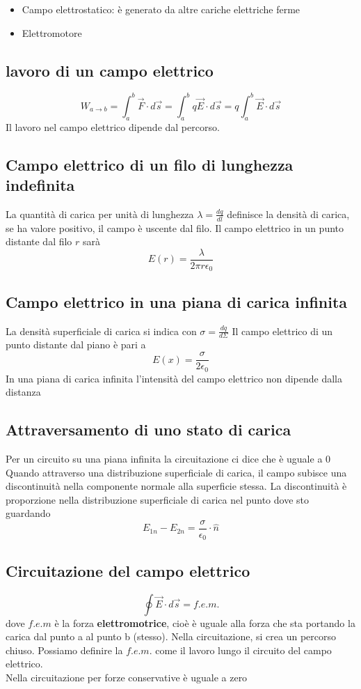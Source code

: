 \documentclass[a4paper]{report}
\begin{document}
  \begin{itemize}
    \item Campo elettrostatico: è generato da altre cariche elettriche ferme
    \item Elettromotore
  \end{itemize}

  \subsection{lavoro di un campo elettrico}
  $$ W_{a \rightarrow b} = \int_a^b \vec{F}\cdot d\vec{s} = \int_a^b q \vec{E} \cdot d\vec{s} = q \int_a^b \vec{E}\cdot d\vec{s} $$
  Il lavoro nel campo elettrico dipende dal percorso.

  \subsection{Campo elettrico di un filo di lunghezza indefinita}
  La quantità di carica per unità di lunghezza $\lambda = \frac{dq}{dl}$ definisce la densità di carica, se ha valore positivo, il campo è uscente dal filo. Il campo elettrico in un punto distante dal filo $r$ sarà
  $$ E(r) = \frac{\lambda}{2\pi r \epsilon_0}$$

  \subsection{Campo elettrico in una piana di carica infinita}
  La densità superficiale di carica si indica con $\sigma = \frac{dq}{d\Sigma}$
  Il campo elettrico di un punto distante dal piano è pari a
  $$E(x) =  \frac{\sigma}{2 \epsilon_0} $$
  In una piana di carica infinita l'intensità del campo elettrico non dipende dalla distanza

  \subsection{Attraversamento di uno stato di carica}
  Per un circuito su una piana infinita la circuitazione ci dice che è uguale a 0\\
  Quando attraverso una distribuzione superficiale di carica, il campo subisce una discontinuità nella componente normale alla superficie stessa. La discontinuità è proporzione nella distribuzione superficiale di carica nel punto dove sto guardando\\
  $$ E_{1n} - E_{2n} = \frac{\sigma}{\epsilon_0} \cdot \hat{n}$$


  \subsection{Circuitazione del campo elettrico}
  $$\oint \vec{E} \cdot d\vec{s} = f.e.m.$$
  dove $f.e.m$ è la forza \textbf{elettromotrice}, cioè è uguale alla forza che sta portando la carica dal punto a al punto b (stesso).
  Nella circuitazione, si crea un percorso chiuso. Possiamo definire la $f.e.m.$ come il lavoro lungo il circuito del campo elettrico.\\
  Nella circuitazione per forze conservative è uguale a zero
\end{document}
